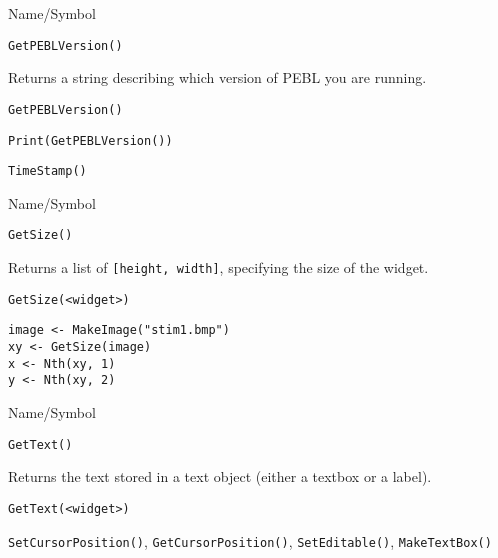 \rl




\begin{desc}{Name/Symbol}
\item[Name/Symbol]	\verb+GetPEBLVersion()+

\item[Description]	Returns a string describing which version of PEBL you are running.

\item[Usage]
\begin{verbatim}
GetPEBLVersion() 
\end{verbatim}

\item[Example]
\begin{verbatim}
Print(GetPEBLVersion())
\end{verbatim}

\item[See Also]	\verb+TimeStamp()+
\end{desc}

\rl



\begin{desc}{Name/Symbol}
\item[Name/Symbol]	\verb+GetSize()+

\item[Description] Returns a list of \verb+[height, width]+,
  specifying the size of the widget.

\item[Usage]
\begin{verbatim}
GetSize(<widget>)
\end{verbatim}

\item[Example]
\begin{verbatim}
image <- MakeImage("stim1.bmp")
xy <- GetSize(image)
x <- Nth(xy, 1)
y <- Nth(xy, 2)
\end{verbatim}

\item[See Also]	
\end{desc}

\rl



\begin{desc}{Name/Symbol}
\item[Name/Symbol]	\verb+GetText()+

\item[Description]	Returns the text stored in a text object 
		(either a textbox or a label).

\item[Usage]
\begin{verbatim}
GetText(<widget>)
\end{verbatim}

\item[Example]	

\item[See Also]	\verb+SetCursorPosition()+, \verb+GetCursorPosition()+, \verb+SetEditable()+, \verb+MakeTextBox()+
\end{desc}

